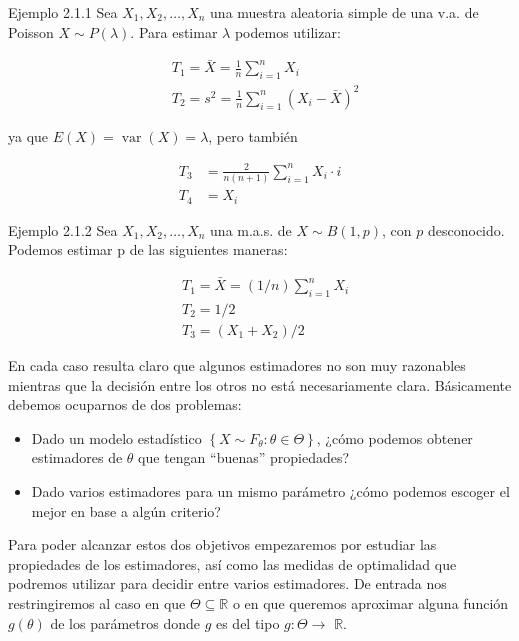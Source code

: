 \documentclass[
]{article}
\providecommand{\tightlist}{%
  \setlength{\itemsep}{0pt}\setlength{\parskip}{0pt}}
\begin{document}
Ejemplo 2.1.1 Sea \(X_{1}, X_{2}, \ldots, X_{n}\) una muestra aleatoria simple de una v.a. de Poisson \(X \sim P(\lambda)\). Para estimar \(\lambda\) podemos utilizar:

\[
\begin{aligned}
& T_{1}=\bar{X}=\frac{1}{n} \sum_{i=1}^{n} X_{i} \\
& T_{2}=s^{2}=\frac{1}{n} \sum_{i=1}^{n}\left(X_{i}-\bar{X}\right)^{2}
\end{aligned}
\]

ya que \(E(X)=\operatorname{var}(X)=\lambda\), pero también

\[
\begin{aligned}
T_{3} & =\frac{2}{n(n+1)} \sum_{i=1}^{n} X_{i} \cdot i \\
T_{4} & =X_{i}
\end{aligned}
\]

Ejemplo 2.1.2 Sea \(X_{1}, X_{2}, \ldots, X_{n}\) una m.a.s. de \(X \sim B(1, p)\), con \(p\) desconocido. Podemos estimar p de las siguientes maneras:

\[
\begin{aligned}
& T_{1}=\bar{X}=(1 / n) \sum_{i=1}^{n} X_{i} \\
& T_{2}=1 / 2 \\
& T_{3}=\left(X_{1}+X_{2}\right) / 2
\end{aligned}
\]

En cada caso resulta claro que algunos estimadores no son muy razonables mientras que la decisión entre los otros no está necesariamente clara. Básicamente debemos ocuparnos de dos problemas:

\begin{itemize}
\tightlist
\item
  Dado un modelo estadístico \(\left\{X \sim F_{\theta}: \theta \in \Theta\right\}\), ¿cómo podemos obtener estimadores de \(\theta\) que tengan ``buenas'' propiedades?
\item
  Dado varios estimadores para un mismo parámetro ¿cómo podemos escoger el mejor en base a algún criterio?
\end{itemize}

Para poder alcanzar estos dos objetivos empezaremos por estudiar las propiedades de los estimadores, así como las medidas de optimalidad que podremos utilizar para decidir entre varios estimadores.
De entrada nos restringiremos al caso en que \(\Theta \subseteq \mathbb{R}\) o en que queremos aproximar alguna función \(g(\theta)\) de los parámetros donde \(g\) es del tipo \(g: \Theta \rightarrow\) \(\mathbb{R}\).
\end{document}
